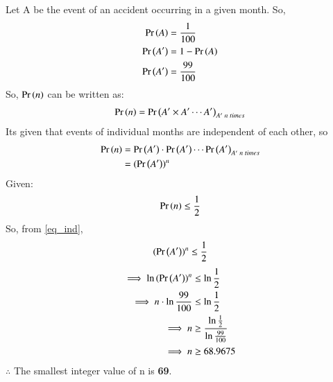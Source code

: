 Let A be the event of an accident occurring in a given month.
So, 
\begin{align}
    \Pr\left(A\right)&=\frac{1}{100}\\
    \Pr\left(A^{\prime}\right)&=1-\Pr\left(A\right)\\
    \Pr\left(A^{\prime}\right)&=\frac{99}{100}
\end{align}
So, $\Pr\left(n\right)$ can be written as:
\begin{align}
    \Pr\left(n\right)=\Pr\left(A^{\prime}\times A^{\prime}\cdots A^{\prime}\right)_{A^{\prime}\; n\; times}
\end{align}
Its given that events of individual months are independent of each other, so
\begin{align}
    \pr{n}&=\pr{A^{\prime}}\cdot \pr{A^{\prime}} \cdots \pr{A^{\prime}}_{A^{\prime}\; n\; times}\\
        &=(\pr{A^{\prime}})^n \label{eq_ind}
\end{align}
Given:
\begin{align}
    \Pr\left(n\right)\le \frac{1}{2}
\end{align}
So, from \eqref{eq_ind},
\begin{align}
    (\pr{A^{\prime}})^n\le \frac{1}{2} \label{eq_log}
\end{align}
\begin{align}
     \implies \ln{ (\ensuremath{\Pr\left(A^{\prime}\right)})^n} &\le \ln {\frac{1}{2}}\\
     \implies n\cdot \ln {\frac{99}{100}} &\le \ln {\frac{1}{2}}\\
     \implies n &\ge \frac{\ln {\frac{1}{2}}}{\ln {\frac{99}{100}}}\\
     \implies n &\ge 68.9675
\end{align}
$\therefore$ The smallest integer value of n is \textbf{69}. 
  
